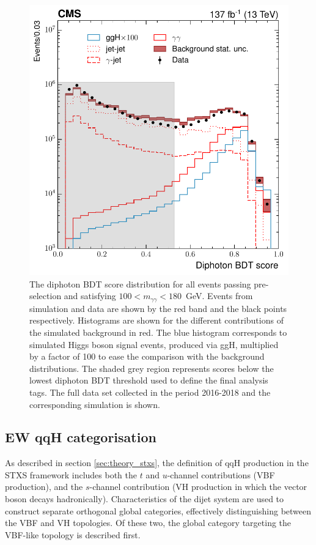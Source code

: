 \begin{figure}[htb!]
  \centering
  \includegraphics[width=.5\textwidth]{Figures/hgg_overview/DiphoBDT_dipho_mva_logPlot_noStack.pdf}
  \caption[Diphoton BDT output score]
  {
    The diphoton BDT score distribution for all events passing pre-selection and satisfying $100<m_{\gamma\gamma}<180$~GeV. Events from simulation and data are shown by the red band and the black points respectively. Histograms are shown for the different contributions of the simulated background in red. The blue histogram corresponds to simulated Higgs boson signal events, produced via ggH, multiplied by a factor of 100 to ease the comparison with the background distributions. The shaded grey region represents scores below the lowest diphoton BDT threshold used to define the final analysis tags. The full data set collected in the period 2016-2018 and the corresponding simulation is shown.
  }
  \label{fig:diphoton_score}
\end{figure}



\FloatBarrier

\subsection{EW qqH categorisation}\label{sec:qqH_categorisation}
As described in section \ref{sec:theory_stxs}, the definition of qqH production in the STXS framework includes both the $t$ and $u$-channel contributions (VBF production), and the $s$-channel contribution (VH production in which the vector boson decays hadronically). Characteristics of the dijet system are used to construct separate orthogonal global categories, effectively distinguishing between the VBF and VH topologies. Of these two, the global category targeting the VBF-like topology is described first. 

